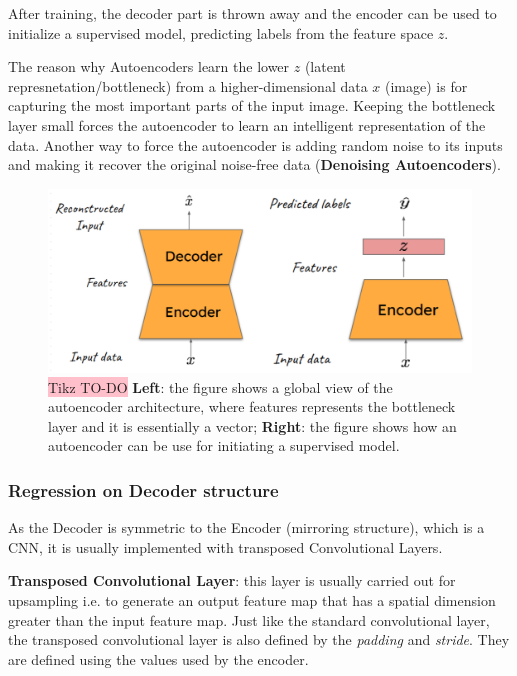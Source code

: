 After training, the decoder part is thrown away and the encoder can be used to initialize a supervised model, predicting labels from the  feature space $z$.

The reason why Autoencoders learn the lower $z$ (latent represnetation/bottleneck) from a higher-dimensional data $x$ (image) is for capturing the most important parts of the input image. Keeping the bottleneck layer small forces the autoencoder to learn an intelligent representation of the data. Another way to force the autoencoder is adding random noise to its inputs and making it recover the original noise-free data (\textbf{Denoising Autoencoders}).


\begin{figure}[!htbp]
    \centering
    \includegraphics[width=\linewidth]{tikz/Autoencoders.png}
    \caption{{\color{red}\colorbox{pink}{Tikz TO-DO}} \textbf{Left}: the figure shows a global view of the autoencoder architecture, where features represents the bottleneck layer and it is essentially a vector; \textbf{Right}: the figure shows how an autoencoder can be use for initiating a supervised model.}
    \label{fig:autoencoder}
\end{figure}

\subsubsection{Regression on Decoder structure}


As the Decoder is symmetric to the Encoder (mirroring structure), which is a CNN, it is usually implemented with transposed Convolutional Layers.

\textbf{Transposed Convolutional Layer}: this layer is usually carried out for upsampling i.e. to generate an output feature map that has a spatial dimension greater than the input feature map. Just like the standard convolutional layer, the transposed convolutional layer is also defined by the \textit{padding} and \textit{stride}. They are defined using the values used by the encoder.

